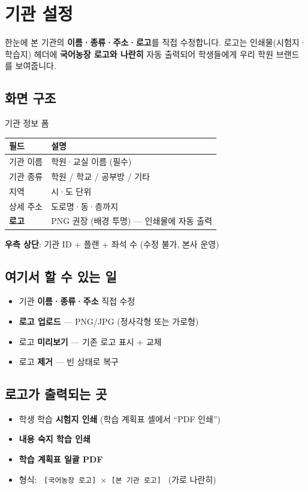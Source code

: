 \chapter{기관 설정}

\begin{summarybox}{한눈에}
본 기관의 \textbf{이름·종류·주소·로고}를 직접 수정합니다. 로고는 인쇄물(시험지·학습지) 헤더에 \textbf{국어농장 로고와 나란히} 자동 출력되어 학생들에게 우리 학원 브랜드를 보여줍니다.
\end{summarybox}


\section*{화면 구조}

\begin{screenbox}{기관 정보 폼}
\noindent
\begin{tabular}{@{}p{3cm}p{8cm}@{}}
\toprule
\textbf{필드} & \textbf{설명} \\
\midrule
기관 이름 & 학원·교실 이름 (필수) \\
기관 종류 & 학원 / 학교 / 공부방 / 기타 \\
지역 & 시·도 단위 \\
상세 주소 & 도로명·동·층까지 \\
\textbf{로고} & PNG 권장 (배경 투명) — 인쇄물에 자동 출력 \\
\bottomrule
\end{tabular}

\medskip
\textbf{우측 상단}: 기관 ID + 플랜 + 좌석 수 (수정 불가, 본사 운영)
\end{screenbox}

\section*{여기서 할 수 있는 일}
\begin{itemize}[leftmargin=1.2em]
  \item 기관 \textbf{이름·종류·주소} 직접 수정
  \item \textbf{로고 업로드} — PNG/JPG (정사각형 또는 가로형)
  \item 로고 \textbf{미리보기} — 기존 로고 표시 + 교체
  \item 로고 \textbf{제거} — 빈 상태로 복구
\end{itemize}

\section*{로고가 출력되는 곳}
\begin{itemize}[leftmargin=1.2em]
  \item 학생 학습 \textbf{시험지 인쇄} (학습 계획표 셀에서 ``PDF 인쇄'')
  \item \textbf{내용 숙지 학습 인쇄}
  \item \textbf{학습 계획표 일괄 PDF}
  \item 형식: \texttt{\,[국어농장 로고] $\times$ [본 기관 로고]\,} (가로 나란히)
\end{itemize}

